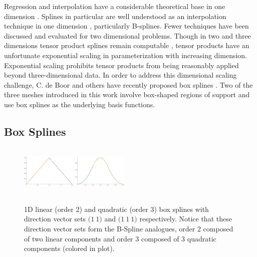 Regression and interpolation have a considerable theoretical base in one dimension \cite{cheney2009course}. Splines in particular are well understood as an interpolation technique in one dimension \cite{de1978practical}, particularly B-splines. Fewer techniques have been discussed and evaluated for two dimensional problems. Though in two and three dimensions tensor product splines remain computable \cite{unther1996interpolating}, tensor products have an unfortunate exponential scaling in parameterization with increasing dimension. Exponential scaling prohibits tensor products from being reasonably applied beyond three-dimensional data. In order to address this dimensional scaling challenge, C. de Boor and others have recently proposed box splines \cite{de2013box}. Two of the three meshes introduced in this work involve box-shaped regions of support and use box splines as the underlying basis functions.



\subsection{Box Splines}
\label{sec_box_splines}

\begin{figure}
  \includegraphics[width=0.23\textwidth,height=2.5cm]{1D-linear.pdf}
  \includegraphics[width=0.23\textwidth,height=2.5cm]{1D-quadratic.pdf}
  \caption{1D linear (order 2) and quadratic (order 3) box splines with direction vector sets $\bigl( 1 \ 1 \bigr)$ and $\bigl( 1 \ 1 \ 1 \bigr)$ respectively. Notice that these direction vector sets form the B-Spline analogues, order 2 composed of two linear components and order 3 composed of 3 quadratic components (colored in plot).
  \vspace{-.5cm}}
  \label{fig_1D_boxes}
\end{figure}

